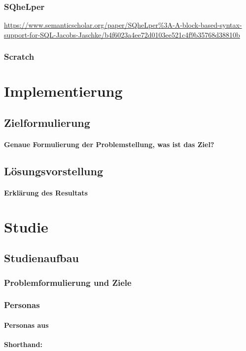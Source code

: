 \documentclass[a4paper, 12pt, oneside, BCOR=1cm,toc=chapterentrywithdots]{scrbook}
\begin{document}
\subsection{SQheLper}
\url{https://www.semanticscholar.org/paper/SQheLper\%3A-A-block-based-syntax-support-for-SQL-Jacobs-Jaschke/b4f6023a4ee72d0103ee521c4f9b35768d38810b}
\subsection{Scratch}


\chapter{Implementierung}
\section{Zielformulierung}
\subsubsection{Genaue Formulierung der Problemstellung, was ist das Ziel?}
\section{Lösungsvorstellung}
\subsubsection{Erklärung des Resultats}

\chapter{Studie}
\section{Studienaufbau}
\subsection{Problemformulierung und Ziele}
\subsection{Personas}
\subsubsection{Personas aus }
\subsubsection{Shorthand: }
\end{document}

